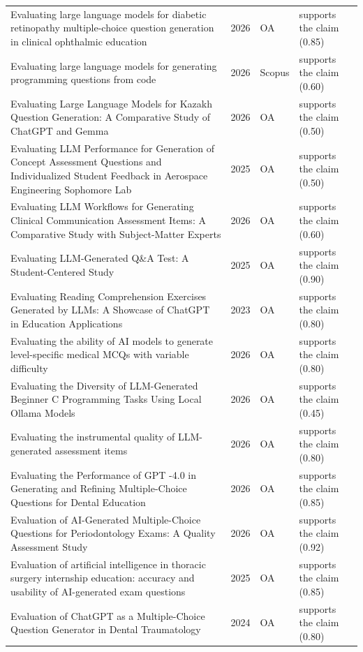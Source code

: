 \begin{longtable}{@{}%
  >{\raggedright\arraybackslash}p{}c%
  >{\raggedright\arraybackslash}p{}%
  >{\raggedright\arraybackslash}p{}@{}}
Evaluating large language models for diabetic retinopathy multiple-choice question generation in clinical ophthalmic education & 2026 & OA & supports the claim (0.85) \\
Evaluating large language models for generating programming questions from code & 2026 & Scopus & supports the claim (0.60) \\
Evaluating Large Language Models for Kazakh Question Generation: A Comparative Study of ChatGPT and Gemma & 2026 & OA & supports the claim (0.50) \\
Evaluating LLM Performance for Generation of Concept Assessment Questions and Individualized Student Feedback in Aerospace Engineering Sophomore Lab & 2025 & OA & supports the claim (0.50) \\
Evaluating LLM Workflows for Generating Clinical Communication Assessment Items: A Comparative Study with Subject-Matter Experts & 2026 & OA & supports the claim (0.60) \\
Evaluating LLM-Generated Q\&A Test: A Student-Centered Study & 2025 & OA & supports the claim (0.90) \\
Evaluating Reading Comprehension Exercises Generated by LLMs: A Showcase of ChatGPT in Education Applications & 2023 & OA & supports the claim (0.80) \\
Evaluating the ability of AI models to generate level-specific medical MCQs with variable difficulty & 2026 & OA & supports the claim (0.80) \\
Evaluating the Diversity of LLM-Generated Beginner C Programming Tasks Using Local Ollama Models & 2026 & OA & supports the claim (0.45) \\
Evaluating the instrumental quality of LLM-generated assessment items & 2026 & OA & supports the claim (0.80) \\
Evaluating the Performance of GPT -4.0 in Generating and Refining Multiple-Choice Questions for Dental Education & 2026 & OA & supports the claim (0.85) \\
Evaluation of AI-Generated Multiple-Choice Questions for Periodontology Exams: A Quality Assessment Study & 2026 & OA & supports the claim (0.92) \\
Evaluation of artificial intelligence in thoracic surgery internship education: accuracy and usability of AI-generated exam questions & 2025 & OA & supports the claim (0.85) \\
Evaluation of ChatGPT as a Multiple-Choice Question Generator in Dental Traumatology & 2024 & OA & supports the claim (0.80) \\

\end{longtable}
